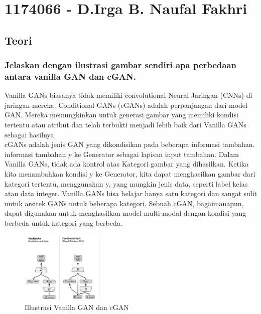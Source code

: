 \section{1174066 - D.Irga B. Naufal Fakhri}

\subsection{Teori}
\subsubsection{Jelaskan dengan ilustrasi gambar sendiri apa perbedaan antara vanilla GAN dan cGAN.}
Vanilla GANs biasanya tidak memiliki convolutional Neural Jaringan (CNNs) di jaringan mereka.
Conditional GANs (cGANs) adalah perpanjangan dari model GAN. Mereka memungkinkan untuk generasi gambar yang memiliki kondisi tertentu atau atribut dan telah terbukti menjadi lebih baik dari Vanilla GANs sebagai hasilnya. \\
cGANs adalah jenis GAN yang dikondisikan pada beberapa informasi tambahan.  informasi tambahan y ke Generator sebagai lapisan input tambahan. Dalam Vanilla GANs, tidak ada kontrol atas Kategori gambar yang dihasilkan. Ketika kita menambahkan kondisi y ke Generator, kita dapat menghasilkan gambar dari kategori tertentu, menggunakan y, yang mungkin jenis data, seperti label kelas atau data integer. Vanilla GANs bisa belajar hanya satu kategori dan sangat sulit untuk arsitek GANs untuk beberapa kategori. Sebuah cGAN, bagaimanapun, dapat digunakan untuk menghasilkan model multi-modal dengan kondisi yang berbeda untuk kategori yang berbeda.
	\hfill \break
	\begin{figure}[H]
		\includegraphics[width=4cm]{figures/1174066/9/1.jpg}
		\centering
		\caption{Illustrasi Vanilla GAN dan cGAN}
	\end{figure}


